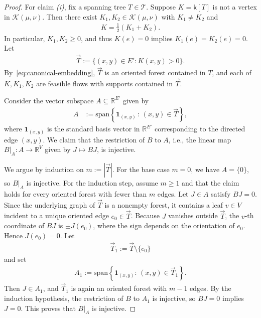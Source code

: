 \documentclass[10pt,a4paper]{amsart}
\newcommand{\setoftrees}{{\mathcal{T}}}
\newcommand{\embedding}{{\mathsf{k}}}
\newcommand{\flowpoly}{{\mathcal{K}}}
\begin{document}
    \begin{proof}
        For claim \emph{(i)}, fix a spanning tree $T\in\setoftrees$. Suppose $K=\embedding[T]$ is not a vertex in $\flowpoly(\mu,\nu)$. Then there exist $K_1,K_2\in\flowpoly(\mu,\nu)$ with $K_1\neq K_2$ and
            \begin{align*}
                K = \frac{1}{2}(K_1+K_2).
            \end{align*}
        In particular, $K_1,K_2\ge 0$, and thus $K(e)=0$ implies $K_1(e)=K_2(e)=0$. Let
            \begin{align*}
                \overrightarrow{T} := \{(x,y)\in E' : K(x,y) > 0\}.
            \end{align*}
        By~\cref{eq:canonical-embedding}, $\overrightarrow{T}$ is an oriented forest contained in $T$, and each of $K,K_1,K_2$ are feasible flows with supports contained in $\overrightarrow{T}$. 

        Consider the vector subspace $A\subseteq\mathbb{R}^{E'}$ given by
            \begin{align*}
                A &:= \mathrm{span} \left\{ \mathbf{1}_{(x,y)} \,:\, (x,y)\in\overrightarrow{T} \right\},
            \end{align*}
        where $\mathbf{1}_{(x,y)}$ is the standard basis vector in $\mathbb{R}^{E'}$ corresponding to the directed edge $(x,y)$. We claim that the restriction of $B$ to $A$, i.e., the linear map $B|_{A}:A\to\mathbb{R}^{V}$ given by $J\mapsto BJ$, is injective. 

        We argue by induction on $m:=|\overrightarrow{T}|$. For the base case $m=0$, we have $A=\{0\}$, so $B|_A$ is injective. For the induction step, assume $m\ge 1$ and that the claim holds for every oriented forest with fewer than $m$ edges. Let $J\in A$ satisfy $BJ=0$. Since the underlying graph of $\overrightarrow{T}$ is a nonempty forest, it contains a leaf $v\in V$ incident to a unique oriented edge $e_0\in\overrightarrow{T}$. Because $J$ vanishes outside $\overrightarrow{T}$, the $v$-th coordinate of $BJ$ is $\pm J(e_0)$, where the sign depends on the orientation of $e_0$. Hence $J(e_0)=0$. Let
            \begin{align*}
                \overrightarrow{T}_1 := \overrightarrow{T}\setminus\{e_0\}
            \end{align*}
        and set
            \begin{align*}
                A_1 := \mathrm{span}\left\{\mathbf{1}_{(x,y)}:\,(x,y)\in\overrightarrow{T}_1\right\}.
            \end{align*}
        Then $J\in A_1$, and $\overrightarrow{T}_1$ is again an oriented forest with $m-1$ edges. By the induction hypothesis, the restriction of $B$ to $A_1$ is injective, so $BJ=0$ implies $J=0$. This proves that $B|_A$ is injective.


\end{proof}
\end{document}
